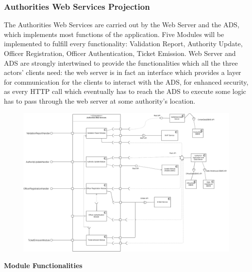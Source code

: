 \documentclass[12pt,a4paper]{article}
\begin{document}
\subsubsection{Authorities Web Services Projection}
The Authorities Web Services are carried out by the Web Server and the ADS, which implements most functions of the application. Five Modules will be implemented to fulfill every functionality: Validation Report, Authority Update, Officer Registration, Officer Authentication, Ticket Emission. Web Server and ADS are strongly intertwined to provide the functionalities which all the three actors' clients need: the web server is in fact an interface which provides a layer for communication for the clients to interact with the ADS, for enhanced security, as every HTTP call which eventually has to reach the ADS to execute some logic has to pass through the web server at some authority's location.
\begin{figure}[H]
				\centering
					\begin{adjustwidth}{-25mm}{-25mm}
					        \includegraphics[width=0.9\paperwidth]{Images/AuthoritiesServicesProjection}
					\end{adjustwidth}
			\end{figure}
\newpage
\textbf{Module Functionalities}
\end{document}
